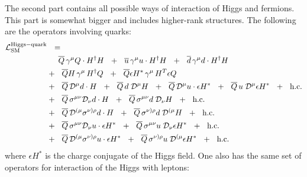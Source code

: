 \documentclass[12pt]{revtex4}
\newcommand{\ov}{\overline}
\newcommand{\md}{\mathcal{D}}
\begin{document}
	The second part contains all possible ways of interaction of
	Higgs and fermions. 
	This part is somewhat bigger and includes higher-rank structures.
	The following are the operators involving quarks:
\begin{align}
\notag
	\mathcal{L}_{\rm SM}^{\rm Higgs-quark} & ~~=~~
	\\
\notag
	&
	\phantom{+~~}
	\ov{Q}\, \gamma^\mu Q \cdot H^\dag H ~~+~~
	\ov{u}\, \gamma^\mu u \cdot H^\dag H ~~+~~
	\ov{d}\, \gamma^\mu d \cdot H^\dag H 
	\\
\notag
	&
	+~~
	\ov{Q}H \, \gamma^\mu\, H^\dag Q ~~+~~
	\ov{Q}\epsilon H^* \, \gamma^\mu \, H^T \epsilon Q 
	\\
\notag
	&
	+~~
	\ov{Q}\, \md^\mu d\cdot H ~~+~~
	\ov{Q}\, d \; \md^\mu H ~~+~~
	\ov{Q}\, \md^\mu u \cdot \epsilon H^* ~~+~~
	\ov{Q}\, u \; \md^\mu \epsilon H^* ~~+~~
	\text{h.c.}
	\\
\notag
	&
	+~~
	\ov{Q}\, \sigma^{\mu\nu} \md_\nu d \cdot H ~~+~~
	\ov{Q}\, \sigma^{\mu\nu} d\; \md_\nu H ~~+~~
	\text{h.c.}
	\\
\notag
	&
	+~~
	\ov{Q}\, \md^{(\mu} \sigma^{\nu)\rho} d \cdot H ~~+~~
	\ov{Q}\, \sigma^{\nu)\rho} d \; \md^{(\mu} H ~~+~~
	\text{h.c.}
	\\
\notag
	&
	+~~
	\ov{Q}\, \sigma^{\mu\nu} \md_\nu u \cdot \epsilon H^* ~~+~~
	\ov{Q}\, \sigma^{\mu\nu} u\; \md_\nu \epsilon H^* ~~+~~
	\text{h.c.}
	\\
\notag
	&
	+~~
	\ov{Q}\, \md^{(\mu} \sigma^{\nu)\rho} u \cdot \epsilon H^* ~~+~~
	\ov{Q}\, \sigma^{\nu)\rho} u \; \md^{(\mu} \epsilon H^* ~~+~~
	\text{h.c.}
\end{align}
	where $ \epsilon H^* $ is the charge conjugate of the Higgs field.	
	One also has the same set of operators for interaction of the Higgs 
	with leptons:
\end{document}
